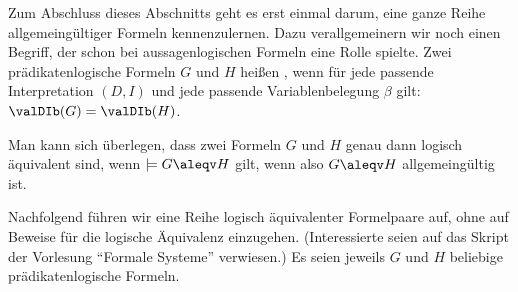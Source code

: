 Zum Abschluss dieses Abschnitts geht es erst einmal darum, eine ganze
Reihe allgemeingültiger Formeln kennenzulernen.
%
Dazu verallgemeinern wir noch einen Begriff, der schon bei
aussagenlogischen Formeln eine Rolle spielte.
%
Zwei prädikatenlogische Formeln $G$ und $H$ heißen , wenn für jede passende
Interpretation $(D,I)$ und jede passende Variablenbelegung $\beta$ gilt:
%
$\valDIb(G) = \valDIb(H)$.

Man kann sich überlegen, dass zwei Formeln $G$ und $H$ genau dann
logisch äquivalent sind, wenn $\models G\aleqv H$ gilt, wenn also
$G\aleqv H$ allgemeingültig ist.

Nachfolgend führen wir eine Reihe logisch äquivalenter Formelpaare
auf, ohne auf Beweise für die logische Äquivalenz einzugehen.
%
(Interessierte seien auf das Skript der Vorlesung "`Formale Systeme"'
verwiesen.)
%
Es seien jeweils $G$ und $H$ beliebige prädikatenlogische Formeln.

